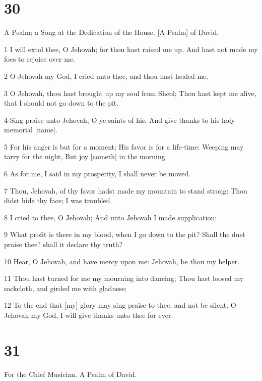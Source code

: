 \chapter{30}

\par A Psalm; a Song at the Dedication of the House. [A Psalm] of David.

\par 1 I will extol thee, O Jehovah; for thou hast raised me up, And hast not made my foes to rejoice over me.
\par 2 O Jehovah my God, I cried unto thee, and thou hast healed me.
\par 3 O Jehovah, thou hast brought up my soul from Sheol; Thou hast kept me alive, that I should not go down to the pit.
\par 4 Sing praise unto Jehovah, O ye saints of his, And give thanks to his holy memorial [name].
\par 5 For his anger is but for a moment; His favor is for a life-time: Weeping may tarry for the night, But joy [cometh] in the morning.
\par 6 As for me, I said in my prosperity, I shall never be moved.
\par 7 Thou, Jehovah, of thy favor hadst made my mountain to stand strong: Thou didst hide thy face; I was troubled.
\par 8 I cried to thee, O Jehovah; And unto Jehovah I made supplication:
\par 9 What profit is there in my blood, when I go down to the pit? Shall the dust praise thee? shall it declare thy truth?
\par 10 Hear, O Jehovah, and have mercy upon me: Jehovah, be thou my helper.
\par 11 Thou hast turned for me my mourning into dancing; Thou hast loosed my sackcloth, and girded me with gladness;
\par 12 To the end that [my] glory may sing praise to thee, and not be silent. O Jehovah my God, I will give thanks unto thee for ever.

\chapter{31}

\par For the Chief Musician. A Psalm of David.

